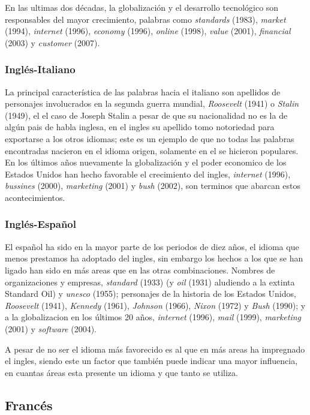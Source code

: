 {En las ultimas dos décadas, la globalización y  el desarrollo tecnológico son
responsables del mayor crecimiento, palabras como \textit{standards} (1983),
\textit{market} (1994), \textit{internet} (1996), \textit{economy} (1996),
\textit{online} (1998), \textit{value} (2001), \textit{financial} (2003) y
\textit{customer} (2007). 
\subsubsection*{Inglés-Italiano} %
La principal característica de las palabras hacia el italiano son apellidos de
personajes involucrados en la segunda guerra mundial, \textit{Roosevelt} (1941)
o \textit{Stalin} (1949), el el caso de Joseph Stalin a pesar de que su
nacionalidad no es la de algún pais de habla inglesa, en el ingles su apellido
tomo notoriedad para exportarse a los otros idiomas; este es un ejemplo de que
no todas las palabras encontradas nacieron en el idioma origen,  solamente en
el se hicieron populares.  En los últimos años nuevamente la globalización y el
poder economico de los Estados Unidos han hecho favorable el crecimiento del
ingles, \textit{internet} (1996), \textit{bussines} (2000), \textit{marketing}
(2001) y \textit{bush} (2002), son terminos que abarcan estos acontecimientos. 
\subsubsection*{Inglés-Español} %
El español ha sido en la mayor parte de los periodos de diez años,  el idioma
que menos prestamos ha adoptado del ingles, sin embargo los hechos a los que se
han ligado han sido en más areas que en las otras combinaciones.  Nombres de
organizaciones y empresas,  \textit{standard} (1933) (y \textit{oil} (1931)
aludiendo a la extinta Standard Oil) y \textit{unesco} (1955);  personajes de
la historia de los Estados Unidos,  \textit{Roosevelt} (1941), \textit{Kennedy}
(1961), \textit{Johnson} (1966),  \textit{Nixon} (1972) y \textit{Bush} (1990);
y a la globalizacion en los últimos 20 años, \textit{internet} (1996),
\textit{mail} (1999), \textit{marketing} (2001) y \textit{software} (2004).   

A pesar de no ser el idioma más favorecido es al que en más areas ha impregnado
el ingles, siendo este un factor que también puede indicar una mayor
influencia,  en cuantas áreas esta presente un idioma y que tanto se utiliza. 

\subsection{Francés} %

}
